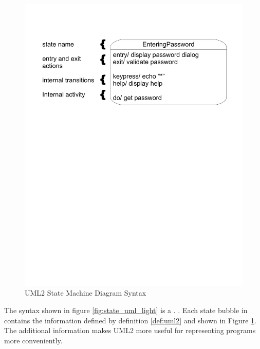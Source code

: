 \clearpage
\begin{figure}[htp]
    \centering
    \includegraphics[trim= 15mm 175mm 15mm 10mm, clip, width=\imgmedium]{./images/state_uml2_syntax_21_4.pdf} 
    \caption{UML2 State Machine Diagram Syntax \cite{UML2}}
    \label{fig:state_uml2}
\end{figure}

The syntax shown in figure \ref{fig:state_uml_light} is a  \cite{UML2}.  \cite{UML2}. Each state bubble in   \cite{UML2} contains the information defined by definition \ref{def:uml2} and shown in Figure \ref{fig:state_uml2}. The additional information makes UML2 more useful for representing programs more conveniently.

